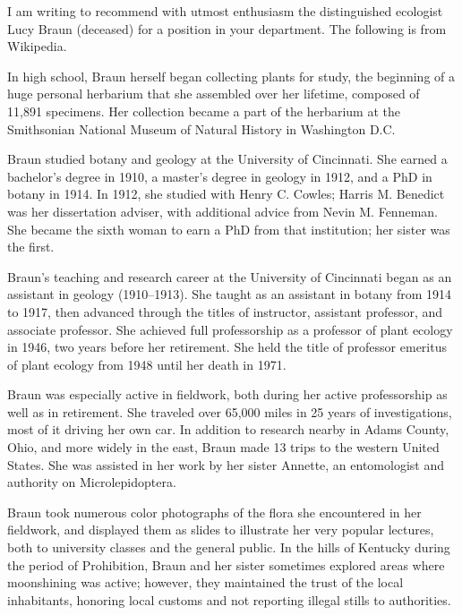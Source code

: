\documentclass[12pt]{hoflet}
\begin{document}
I am writing to recommend with utmost enthusiasm the distinguished ecologist Lucy Braun (deceased) for a position in your department. The following is from Wikipedia.

In high school, Braun herself began collecting plants for study, the beginning of a huge personal herbarium that she assembled over her lifetime, composed of 11,891 specimens. Her collection became a part of the herbarium at the Smithsonian National Museum of Natural History in Washington D.C.

Braun studied botany and geology at the University of Cincinnati. She earned a bachelor's degree in 1910, a master's degree in geology in 1912, and a PhD in botany in 1914. In 1912, she studied with Henry C. Cowles; Harris M. Benedict was her dissertation adviser, with additional advice from Nevin M. Fenneman. She became the sixth woman to earn a PhD from that institution; her sister was the first. 

Braun's teaching and research career at the University of Cincinnati began as an assistant in geology (1910–1913). She taught as an assistant in botany from 1914 to 1917, then advanced through the titles of instructor, assistant professor, and associate professor. She achieved full professorship as a professor of plant ecology in 1946, two years before her retirement. She held the title of professor emeritus of plant ecology from 1948 until her death in 1971.

Braun was especially active in fieldwork, both during her active professorship as well as in retirement. She traveled over 65,000 miles in 25 years of investigations, most of it driving her own car. In addition to research nearby in Adams County, Ohio, and more widely in the east, Braun made 13 trips to the western United States. She was assisted in her work by her sister Annette, an entomologist and authority on Microlepidoptera.

Braun took numerous color photographs of the flora she encountered in her fieldwork, and displayed them as slides to illustrate her very popular lectures, both to university classes and the general public. In the hills of Kentucky during the period of Prohibition, Braun and her sister sometimes explored areas where moonshining was active; however, they maintained the trust of the local inhabitants, honoring local customs and not reporting illegal stills to authorities.
\end{document}
